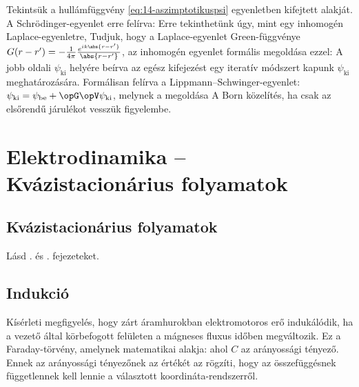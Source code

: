    Tekintsük a hullámfüggvény \eqref{eq:14-aszimptotikuspsi} egyenletben kifejtett alakját.
   A Schrödinger-egyenlet erre felírva:
   Erre tekinthetünk úgy, mint egy inhomogén Laplace-egyenletre, Tudjuk, hogy a Laplace-egyenlet Green-függvénye $G(r-r')=-\frac{1}{4\pi}\frac{e^{ik\abs{r-r'}}}{\abs{r-r'}}$, az inhomogén egyenlet formális megoldása ezzel:
   A jobb oldali $\psi_\text{ki}$ helyére beírva az egész kifejezést egy iteratív módszert kapunk $\psi_\text{ki}$ meghatározására.
   Formálisan felírva a Lippmann--Schwinger-egyenlet: $\psi_\text{ki}=\psi_\text{be}+\opG\opV\psi_\text{ki}$, melynek a megoldása
   A Born közelítés, ha csak az elsőrendű járulékot vesszük figyelembe. 
   
 \section{Elektrodinamika -- Kvázistacionárius folyamatok}
  
  \subsection{Kvázistacionárius folyamatok}
   
   Lásd . és . fejezeteket.
   
  \subsection{Indukció}
  
  Kísérleti megfigyelés, hogy zárt áramhurokban elektromotoros erő indukálódik, ha a vezető által körbefogott felületen a mágneses fluxus időben megváltozik.
   Ez a Faraday-törvény, amelynek matematikai alakja:
  ahol $C$ az arányossági tényező.
   Ennek az arányossági tényezőnek az értékét az rögzíti, hogy az összefüggésnek függetlennek kell lennie a választott koordináta-rendszerről. 
  
